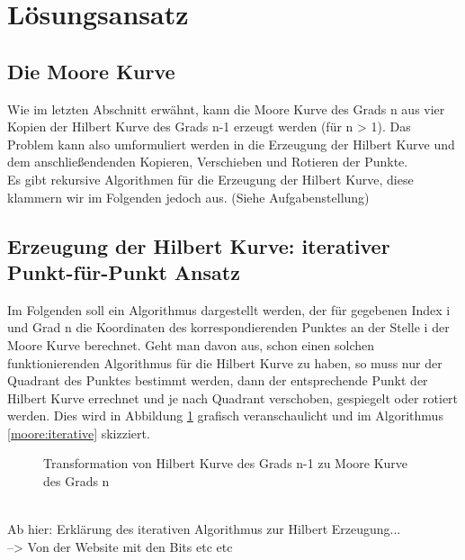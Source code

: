 \documentclass[course=erap]{aspdoc}
\begin{document}




\section{Lösungsansatz}

\subsection{Die Moore Kurve}

Wie im letzten Abschnitt erwähnt, kann die Moore Kurve des Grads n aus vier Kopien der Hilbert Kurve des Grads n-1 erzeugt werden (für n > 1).
Das Problem kann also umformuliert werden in die Erzeugung der Hilbert Kurve und dem anschließendenden Kopieren, Verschieben und Rotieren der Punkte. 
\\
Es gibt rekursive Algorithmen für die Erzeugung der Hilbert Kurve, diese klammern wir im Folgenden jedoch aus. (Siehe Aufgabenstellung)

\subsection{Erzeugung der Hilbert Kurve: iterativer Punkt-für-Punkt Ansatz}
Im Folgenden soll ein Algorithmus dargestellt werden, der für gegebenen Index i und Grad n die Koordinaten des korrespondierenden Punktes an der Stelle i der Moore Kurve berechnet.
Geht man davon aus, schon einen solchen funktionierenden Algorithmus für die Hilbert Kurve zu haben, so muss nur der Quadrant des Punktes bestimmt werden, dann der entsprechende Punkt der Hilbert Kurve errechnet und je nach Quadrant verschoben, gespiegelt oder rotiert werden. Dies wird in Abbildung \ref{HilbertZuMoore} grafisch veranschaulicht und im Algorithmus \ref{moore:iterative} skizziert.

\begin{figure}[h]
\centering
\def\svgwidth{240pt}

\caption{Transformation von Hilbert Kurve des Grads n-1 zu Moore Kurve des Grads n}
\label{HilbertZuMoore}
\end{figure}
\ \\
Ab hier: Erklärung des iterativen Algorithmus zur Hilbert Erzeugung...
\\--> Von der Website mit den Bits etc etc 
\ \\
\end{document}

